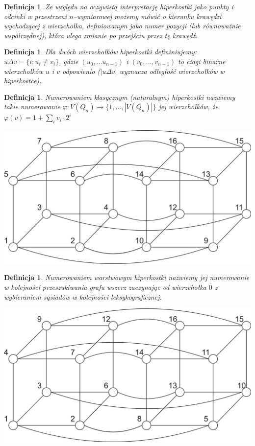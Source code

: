 \documentclass{pracamgr}
\newtheorem{defi}[theorem]{Definicja}
\begin{document}
    \begin{defi}\label{kierunek krawędzi}
     Ze względu na oczywistą interpretację hiperkostki jako punkty i odcinki w przestrzeni $n$--wymiarowej możemy mówić o \emph{kierunku}
     krawędzi wychodzącej z wierzchołka, definiowanym jako numer pozycji (lub równoważnie współrzędnej), która ulega zmianie po przejściu przez tę krawędź.
    \end{defi}
    \begin{defi}\label{delta wierzcholkow}
     Dla dwóch wierzchołków hiperkostki defininiujemy:
     $u\Delta v=\{i:u_i\neq v_i\}$, gdzie $(u_0,...u_{n-1})$ i $(v_0,...,v_{n-1})$ to ciagi binarne wierzchołków $u$ i $v$ odpowienio
     ($|u\Delta v|$ wyznacza odległość wierzchołków w hiperkostce).
    \end{defi}
    \begin{defi}\label{numerowanie klasyczne}
     \emph{Numerowaniem klasycznym (naturalnym)} hiperkostki nazwiemy takie numerowanie $\varphi:V(Q_n)\rightarrow\{1,...,|V(Q_n)|\}$ jej wierzchołków, że
     $\varphi(v)=1+\sum_{i}v_i\cdot2^i$
    \end{defi}
    \begin{center}
     \includegraphics[scale=0.6]{img/Q_4_klasyczne.jpg}
    \end{center}
    \begin{defi}\label{numerowanie warstwowe}
     \emph{Numerowaniem warstwowym} hiperkostki nazwiemy jej numerowanie w kolejności przeszukiwania grafu wszerz zaczynając od wierzchołka $\overline{0}$
     z wybieraniem sąsiadów w kolejności leksykograficznej.
    \end{defi}
    \begin{center}
    \includegraphics[scale=0.6]{img/Q_4_warstwowe.jpg}
   \end{center}   
\end{document}
